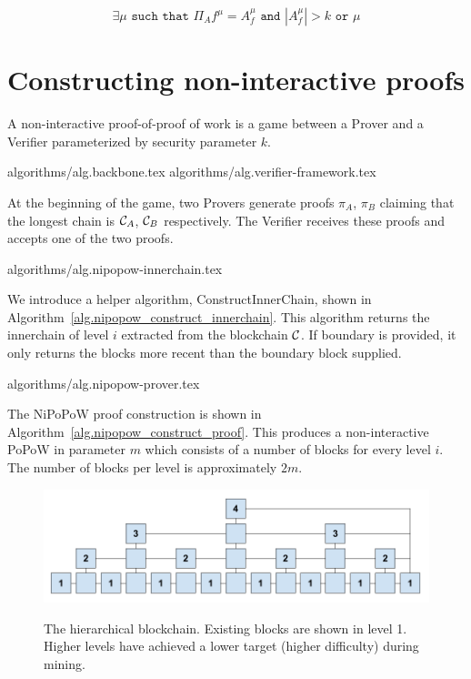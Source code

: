 \documentclass[11pt]{llncs}
\begin{document}
\begin{equation*}
    \exists \mu \texttt{ such that } \Pi_{A}{f}^{\mu} = A_f^{\mu}
    \texttt{ and }
    |A_f^{\mu}| > k
    \texttt{ or } \mu
\end{equation*}

\section{Constructing non-interactive proofs}

A non-interactive proof-of-proof of work is a game between a Prover and a
Verifier parameterized by security parameter $k$.

{algorithms/alg.backbone.tex}
{algorithms/alg.verifier-framework.tex}

At the beginning of the game, two Provers generate proofs $\pi_A$, $\pi_B$
claiming that the longest chain is $\mathcal{C}_A$, $\mathcal{C}_B$ respectively. The
Verifier receives these proofs and accepts one of the two proofs.

{algorithms/alg.nipopow-innerchain.tex}

We introduce a helper algorithm, ConstructInnerChain, shown in
Algorithm~\ref{alg.nipopow_construct_innerchain}. This algorithm returns the innerchain
of level $i$ extracted from the blockchain $\mathcal{C}$. If boundary is provided,
it only returns the blocks more recent than the boundary block supplied.

{algorithms/alg.nipopow-prover.tex}

The NiPoPoW proof construction is shown in Algorithm~\ref{alg.nipopow_construct_proof}.
This produces a non-interactive PoPoW in parameter $m$ which consists of a
number of blocks for every level $i$. The number of blocks per level is
approximately $2m$.

\begin{figure}[h]
    \caption{The hierarchical blockchain. Existing blocks are shown in level 1.
    Higher levels have achieved a lower target (higher difficulty) during mining.}
    \centering
    \includegraphics[width=\textwidth,keepaspectratio]{figures/hierarchical-ledger.png}
    \label{fig:hierarchy}
\end{figure}
\end{document}
